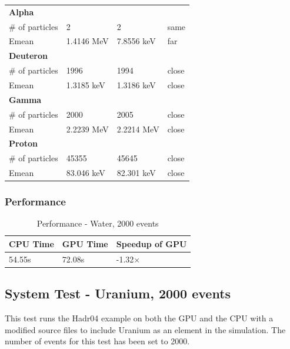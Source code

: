 \documentclass[12pt]{article}
\begin{document}
\begin{table}[H]
\begin{tabular}{lp{2.3cm}p{2.3cm}l}
		\bf{Alpha}&&&\\
		\# of particles&2&2&same\\
		Emean&1.4146 MeV&7.8556 keV&far\\
		
		\bf{Deuteron}&&&\\
		\# of particles&1996&1994&close\\
		Emean&1.3185 keV&1.3186 keV&close\\
		
		\bf{Gamma}&&&\\
		\# of particles&2000&2005&close\\
		Emean&2.2239 MeV&2.2214 MeV&close\\
		
		\bf{Proton}&&&\\
		\# of particles&45355&45645&close\\
		Emean&83.046 keV&82.301 keV&close\\\bottomrule
		
		\end{tabular}
		\end{table}	

	\subsubsection{Performance}
		\begin{table}[!htbp]
		\centering
		\caption{Performance - Water, 2000 events}\label{_acc}
		\begin{tabular}{lll}
		\toprule
		CPU Time& GPU Time&Speedup of GPU\\\midrule
		54.55s&72.08s&-1.32$\times$\\
		\end{tabular}
		\end{table}

\subsection{System Test - Uranium, 2000 events}
This test runs the Hadr04 example on both the GPU and the CPU with a modified source files to include Uranium as an element in the simulation. The number of events for this test has been set to 2000.
\end{document}
